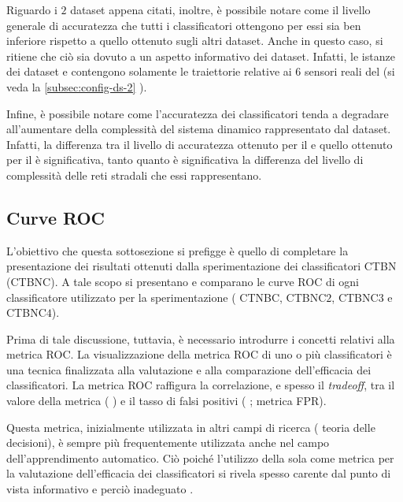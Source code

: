 Riguardo i $2$ dataset appena citati, inoltre, è possibile notare come il livello generale di accuratezza che tutti i classificatori ottengono per essi sia ben inferiore rispetto a quello ottenuto sugli altri dataset. Anche in questo caso, si ritiene che ciò sia dovuto a un aspetto informativo dei dataset. Infatti, le istanze dei dataset  e  contengono solamente le traiettorie relative ai $6$ sensori reali del  (si veda la \autoref{subsec:config-ds-2} ).

Infine, è possibile notare come l'accuratezza dei classificatori tenda a degradare all'aumentare della complessità del sistema dinamico rappresentato dal dataset. Infatti, la differenza tra il livello di accuratezza ottenuto per il  e quello ottenuto per il  è significativa, tanto quanto è significativa la differenza del livello di complessità delle reti stradali che essi rappresentano.

\subsection{Curve ROC}
L'obiettivo che questa sottosezione si prefigge è quello di completare la presentazione dei risultati ottenuti dalla sperimentazione dei classificatori \acs{CTBN} (\acs{CTBNC}). A tale scopo si presentano e comparano le curve \acf{ROC} di ogni classificatore utilizzato per la sperimentazione (\ie{} \acs{CTNBC}, \acs{CTBNC}$2$, \acs{CTBNC}$3$ e \acs{CTBNC}$4$).

Prima di tale discussione, tuttavia, è necessario introdurre i concetti relativi alla metrica \acs{ROC}. La visualizzazione della metrica \acs{ROC} di uno o più classificatori è una tecnica finalizzata alla valutazione e alla comparazione dell'efficacia dei classificatori. La metrica \acs{ROC} raffigura la correlazione, e spesso il \emph{tradeoff}, tra il valore della metrica \emph{} (\ie{} \emph{}) e il tasso di falsi positivi (\ie{} \emph{}; metrica \acs{FPR}).

Questa metrica, inizialmente utilizzata in altri campi di ricerca (\eg{} teoria delle decisioni), è sempre più frequentemente utilizzata anche nel campo dell'apprendimento automatico. Ciò poiché l'utilizzo della sola \emph{} come metrica per la valutazione dell'efficacia dei classificatori si rivela spesso carente dal punto di vista informativo e perciò inadeguato \citep[per approfondimenti si veda][]{Provost1997,Provost2001}.

